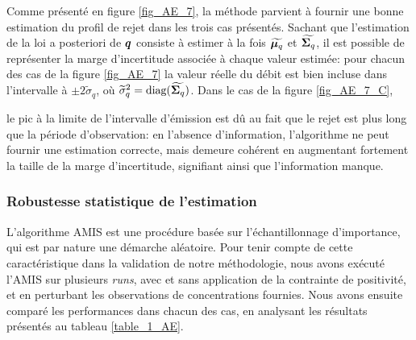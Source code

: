   Comme présenté en figure \ref{fig_AE_7}, la méthode parvient à fournir une bonne estimation du profil de rejet dans les trois cas présentés. Sachant que l'estimation de la loi a posteriori de ${\bm{q}}$ consiste à estimer à la fois ${\widetilde{\bm{\mu}_q}}$ et ${\widetilde{\bm{\Sigma}_q}}$, il est possible de représenter la marge d'incertitude associée à chaque valeur estimée: pour chacun des cas de la figure \ref{fig_AE_7} la valeur réelle du débit est bien incluse dans l'intervalle à $\pm 2\widetilde{\sigma}_q$, où $\widetilde{\sigma}_q^2 = \text{diag}({\widetilde{\bm{\Sigma}_q}})$. Dans le cas de la figure \ref{fig_AE_7_C}, 
  
  
  le pic à la limite de l'intervalle d'émission est dû au fait que le rejet est plus long que la période d'observation: en l'absence d'information, l'algorithme ne peut fournir une estimation correcte, mais demeure cohérent  en augmentant fortement la taille de la marge d'incertitude, signifiant ainsi que l'information manque. \\
  
  \subsubsection{Robustesse statistique de l'estimation}
    
    L'algorithme AMIS est une procédure basée sur l'échantillonnage d'importance, qui est par nature une démarche aléatoire. Pour tenir compte de cette caractéristique dans la validation de notre méthodologie, nous avons exécuté l'AMIS sur plusieurs \textit{runs}, avec et sans application de la contrainte de positivité, et en perturbant les observations de concentrations fournies. Nous avons ensuite comparé les performances dans chacun des cas, en analysant les résultats présentés au tableau \ref{table_1_AE}. 
    
